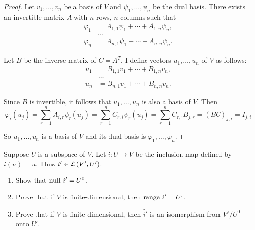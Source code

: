 \begin{proof}
    Let $v_{1}, \ldots, v_{n}$ be a basis of $V$ and $\psi_{1}, \ldots, \psi_{n}$ be the dual basis. There exists an invertible matrix $A$ with $n$ rows, $n$ columns such that
    \begin{align*}
        \varphi_{1} & = A_{1,1}\psi_{1} + \cdots + A_{1,n}\psi_{n}, \\
                    & \ldots                                        \\
        \varphi_{n} & = A_{n,1}\psi_{1} + \cdots + A_{n,n}\psi_{n}.
    \end{align*}

    Let $B$ be the inverse matrix of $C = A^{T}$. I define vectors $u_{1}, \ldots, u_{n}$ of $V$ as follows:
    \begin{align*}
        u_{1} & = B_{1,1}v_{1} + \cdots + B_{1,n}v_{n}, \\
              & \ldots                                  \\
        u_{n} & = B_{n,1}v_{1} + \cdots + B_{n,n}v_{n}.
    \end{align*}

    Since $B$ is invertible, it follows that $u_{1}, \ldots, u_{n}$ is also a basis of $V$. Then
    \[
        \varphi_{i}(u_{j}) = \sum^{n}_{r=1} A_{i,r}\psi_{r}(u_{j}) = \sum^{n}_{r=1} C_{r,i}\psi_{r}(u_{j}) = \sum^{n}_{r=1} C_{r,i}B_{j,r} = {(BC)}_{j,i} = I_{j,i}
    \]

    So $u_{1}, \ldots, u_{n}$ is a basis of $V$ and its dual basis is $\varphi_{1}, \ldots, \varphi_{n}$.
\end{proof}
\newpage

\begin{exercise}
    Suppose $U$ is a subspace of $V$. Let $i: U\to V$ be the inclusion map defined by $i(u) = u$. Thus $i'\in \mathcal{L}\left({V', U'}\right)$.
    \begin{enumerate}[label={(\alph*)}]
        \item Show that $\operatorname{null}\,{i'} = U^{0}$.
        \item Prove that if $V$ is finite-dimensional, then $\operatorname{range}\,{i'} = U'$.
        \item Prove that if $V$ is finite-dimensional, then $\tilde{i'}$ is an isomorphism from $V'/U^{0}$ onto $U'$.
    \end{enumerate}
\end{exercise}

